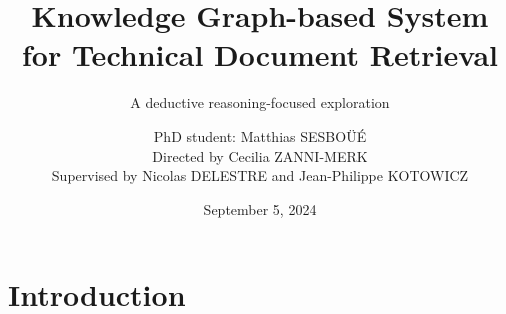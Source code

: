 

\title{Knowledge Graph-based System for Technical Document Retrieval}
\subtitle{A deductive reasoning-focused exploration\vspace{-1em}}
\author[Matthias SESBO{\"U}{\'E}]{PhD student: Matthias SESBO{\"U}{\'E}\\Directed by Cecilia ZANNI-MERK\\Supervised by Nicolas DELESTRE and Jean-Philippe KOTOWICZ\vspace{-1em}}
\date{September 5, 2024}


    
    
    

    \section{Introduction}
    
    
